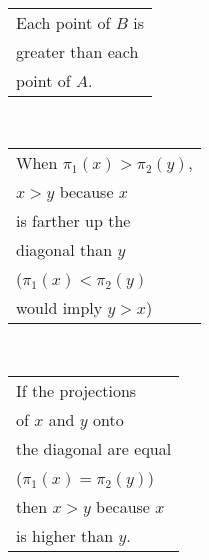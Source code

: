 \begin{minipage}[t]{.33\linewidth}
\hspace*{-7mm}\\[2mm]
\begin{tabular}{l}
 Each point of $B$ is\\
 greater than each\\
 point of $A$.
\end{tabular}
\end{minipage}
%
\begin{minipage}[t]{.33\linewidth}
\hspace*{-7mm}\\[2mm]
\begin{tabular}{l}
When $\pi_1(x)>\pi_2(y)$,\\
 $x>y$ because $x$ \\
is farther up the \\
diagonal than $y$ \\
($\pi_1(x)<\pi_2(y)$ \\
would imply $y>x$)
\end{tabular}
\end{minipage}
%
\begin{minipage}[t]{.33\linewidth}
\hspace*{-7mm}\\[2mm]
\begin{tabular}{l}
 If the projections \\
of $x$ and $y$ onto \\
the diagonal are equal \\
($\pi_1(x) = \pi_2(y)$) \\
then $x>y$ because $x$ \\
is higher than $y$.
\end{tabular}
\end{minipage}

